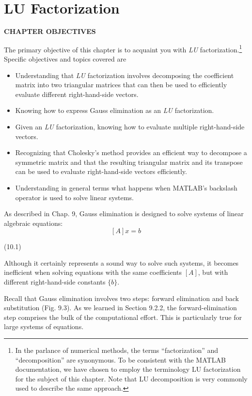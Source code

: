\documentclass[../main.tex]{subfiles}
\begin{document}
\theoremstyle{definition}

\chapter{LU Factorization}

\begin{center}
\textbf{CHAPTER OBJECTIVES}
\end{center}
The primary objective of this chapter is to acquaint you with \textit{LU} factorization.\label{oneLU}\footnote{In the parlance of numerical methods, the terms “factorization” and “decomposition” are synonymous. To be
consistent with the MATLAB documentation, we have chosen to employ the terminology LU factorization for
the subject of this chapter. Note that LU decomposition is very commonly used to describe the same approach.}
Specific objectives and topics covered are
\begin{itemize}
	\item Understanding that \textit{LU} factorization involves decomposing the coefficient matrix into two triangular matrices that can then be used to efficiently evaluate different right-hand-side vectors.
	\item Knowing how to express Gauss elimination as an \textit{LU} factorization.
	\item Given an \textit{LU} factorization, knowing how to evaluate multiple right-hand-side vectors.
	\item Recognizing that Cholesky's method provides an efficient way to decompose a symmetric matrix and that the resulting triangular matrix and its transpose can be used to evaluate right-hand-side vectors efficiently.
	\item Understanding in general terms what happens when MATLAB's backslash operator is used to solve linear systems.
\end{itemize}

As described in Chap. 9, Gauss elimination is designed to solve systems of linear algebraic equations:
$$[A]{x}={b}$$
\begin{flushright}
(10.1)
\end{flushright}
Although it certainly represents a sound way to solve such systems, it becomes inefficient when solving equations with the same coefficients $[A]$, but with different right-hand-side constants $\{b\}$.

Recall that Gauss elimination involves two steps: forward elimination and back substitution (Fig. 9.3). As we learned in Section 9.2.2, the forward-elimination step comprises the bulk of the computational effort. This is particularly true for large systems of equations.
\end{document}
